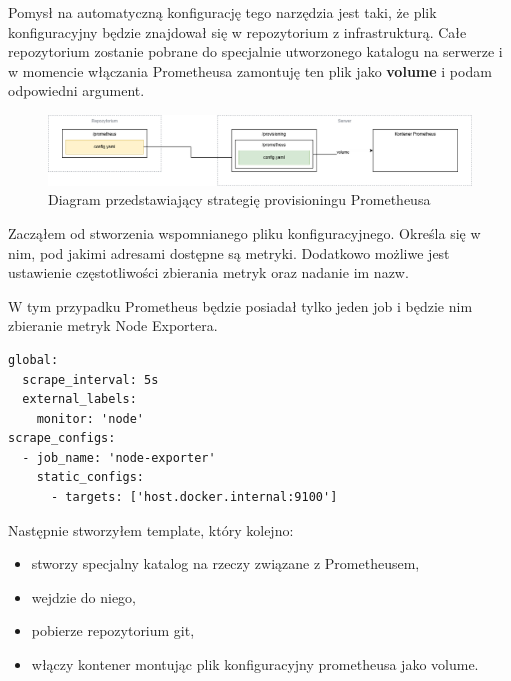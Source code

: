 \documentclass{article}
\begin{document}
Pomysł na automatyczną konfigurację tego narzędzia jest taki, że plik konfiguracyjny będzie znajdował się w repozytorium z infrastrukturą. Całe repozytorium zostanie pobrane do specjalnie utworzonego katalogu na serwerze i w momencie włączania Prometheusa zamontuję ten plik jako \textbf{volume} i podam odpowiedni argument.

\begin{figure}[H]
    \centering
    \includegraphics[width=1\linewidth]{diagramProvisionPrometheus.png}
    \caption{Diagram przedstawiający strategię provisioningu Prometheusa}
    \label{fig:enter-label}
\end{figure}

Zacząłem od stworzenia wspomnianego pliku konfiguracyjnego. Określa się w nim, pod jakimi adresami dostępne są metryki. Dodatkowo możliwe jest ustawienie częstotliwości zbierania metryk oraz nadanie im nazw.

W tym przypadku Prometheus będzie posiadał tylko jeden job i będzie nim zbieranie metryk Node Exportera.

\begin{lstlisting}[caption=Plik \texttt{infrastructure/prometheus/prometheus.yml}]
global:
  scrape_interval: 5s
  external_labels:
    monitor: 'node'
scrape_configs:
  - job_name: 'node-exporter'
    static_configs:
      - targets: ['host.docker.internal:9100']

\end{lstlisting}

Następnie stworzyłem template, który kolejno:
\begin{itemize}
    \item stworzy specjalny katalog na rzeczy związane z Prometheusem,
    \item wejdzie do niego,
    \item pobierze repozytorium git,
    \item włączy kontener montując plik konfiguracyjny prometheusa jako volume.
\end{itemize}
\end{document}
